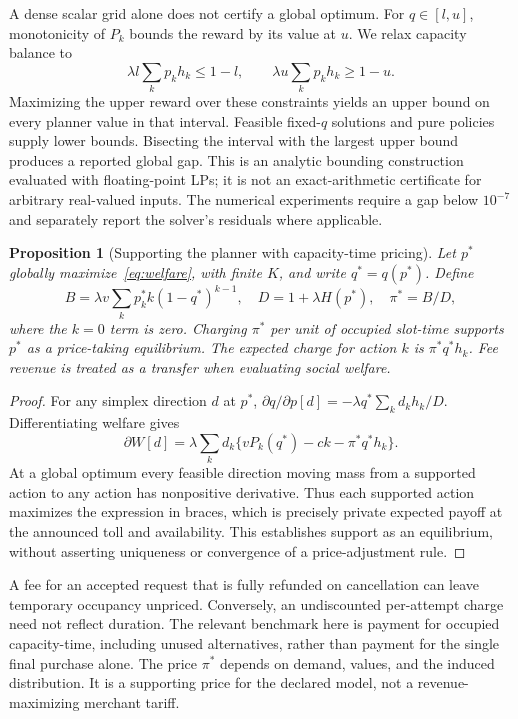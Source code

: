 \documentclass[11pt,a4paper]{article}
\newtheorem{proposition}[theorem]{Proposition}
\begin{document}
A dense scalar grid alone does not certify a global optimum. For $q\in[l,u]$, monotonicity of $P_k$ bounds the reward by its value at $u$. We relax capacity balance to
\begin{equation}
 \lambda l\sum_kp_kh_k\leq1-l,\qquad
 \lambda u\sum_kp_kh_k\geq1-u.\label{eq:bound}
\end{equation}
Maximizing the upper reward over these constraints yields an upper bound on every planner value in that interval. Feasible fixed-$q$ solutions and pure policies supply lower bounds. Bisecting the interval with the largest upper bound produces a reported global gap. This is an analytic bounding construction evaluated with floating-point LPs; it is not an exact-arithmetic certificate for arbitrary real-valued inputs. The numerical experiments require a gap below $10^{-7}$ and separately report the solver's residuals where applicable.

\begin{proposition}[Supporting the planner with capacity-time pricing]\label{prop:toll}
Let $p^*$ globally maximize~\eqref{eq:welfare}, with finite $K$, and write $q^*=q(p^*)$. Define
\begin{equation}
 B=\lambda v\sum_kp_k^*k(1-q^*)^{k-1},\quad
 D=1+\lambda H(p^*),\quad \pi^*=B/D,\label{eq:toll}
\end{equation}
where the $k=0$ term is zero. Charging $\pi^*$ per unit of occupied slot-time supports $p^*$ as a price-taking equilibrium. The expected charge for action $k$ is $\pi^*q^*h_k$. Fee revenue is treated as a transfer when evaluating social welfare.
\end{proposition}
\begin{proof}
For any simplex direction $d$ at $p^*$,
$\partial q/\partial p[d]=-\lambda q^*\sum_kd_kh_k/D$.
Differentiating welfare gives
\[
 \partial W[d]=\lambda\sum_kd_k\{vP_k(q^*)-ck-\pi^*q^*h_k\}.
\]
At a global optimum every feasible direction moving mass from a supported action to any action has nonpositive derivative. Thus each supported action maximizes the expression in braces, which is precisely private expected payoff at the announced toll and availability. This establishes support as an equilibrium, without asserting uniqueness or convergence of a price-adjustment rule.
\end{proof}

A fee for an accepted request that is fully refunded on cancellation can leave temporary occupancy unpriced. Conversely, an undiscounted per-attempt charge need not reflect duration. The relevant benchmark here is payment for occupied capacity-time, including unused alternatives, rather than payment for the single final purchase alone. The price $\pi^*$ depends on demand, values, and the induced distribution. It is a supporting price for the declared model, not a revenue-maximizing merchant tariff.
\end{document}
